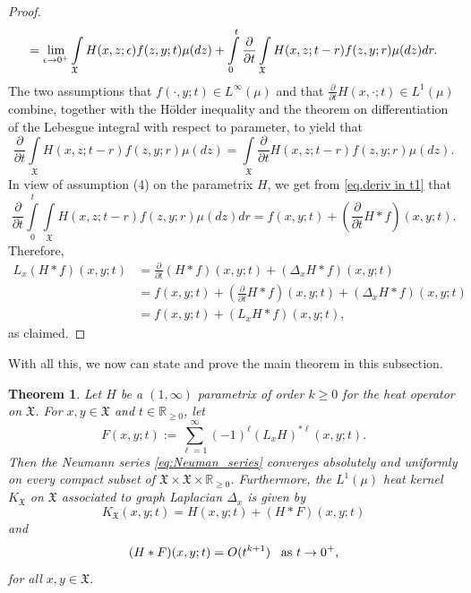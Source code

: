 \documentclass[11pt,reqno]{amsart}
\newtheorem{theorem}{Theorem}
\theoremstyle{remark}
\theoremstyle{definition}
\numberwithin{theorem}{section} \numberwithin{equation}{section}
\newcommand{\X}{\mathfrak{X}}
\begin{document}
\begin{proof}
\begin{align}
=\lim_{\epsilon\to0^+}\int\limits_{\X}H(x,z;\epsilon)f(z,y;t)\mu(dz)+\int\limits _{0}^{t} \frac{\partial}{\partial t} \int\limits_{\X}
H(x,z;t-r)f(z,y;r) \mu(dz)dr.\notag
\end{align}
The two assumptions that $f(\cdot,y;t)\in L^\infty(\mu)$ and that $\frac{\partial}{\partial t}  H(x,\cdot;t)\in L^1(\mu)$ combine,
together with the H\"older inequality and the theorem on differentiation of the Lebesgue integral with respect to parameter, to yield that
$$
\frac{\partial}{\partial t} \int\limits_{\X}
H(x,z;t-r)f(z,y;r) \mu(dz)= \int\limits_{\X}\frac{\partial}{\partial t} H(x,z;t-r)f(z,y;r) \mu(dz).
$$
In view of assumption (4) on the parametrix $H$, we get from \eqref{eq.deriv in t1} that
$$
\frac{\partial}{\partial t}\int\limits _{0}^{t}\int\limits_{\X}H(x,z;t-r)f(z,y;r) \mu(dz)dr= f(x,y;t) +
\left(\frac{\partial}{\partial t}H\ast f\right)(x,y;t).
$$
Therefore,
\begin{align*}
L_{x}(H\ast f)(x,y;t) &=
  \frac{\partial}{\partial t}(H\ast f)(x,y;t)+   (\Delta_{x}H\ast f)(x,y;t)
\\&=f(x,y;t)+\left(\frac{\partial}{\partial t}H\ast f\right)(x,y;t)+(\Delta_{x}H\ast f)(x,y;t)
\\&=f(x,y;t)+(L_{x}H\ast f)(x,y;t),
\end{align*}
as claimed.
\end{proof}

With all this, we now can state and prove the main theorem in this subsection.

\begin{theorem}
\label{thm: formula for heat kernel} Let $H$ be a $(1,\infty)$ parametrix of
order $k\geq0$ for the heat operator on $\X$.  For $x,y\in \X$ and $t\in \mathbb{R}_{\geq 0}$, let
\begin{equation}\label{eq:Neuman_series}
F(x,y;t):=\sum_{\ell=1}^{\infty}(-1)^{\ell}
(L_{x}H)^{\ast\ell}(x,y;t).
\end{equation}
Then the Neumann series \eqref{eq:Neuman_series}
converges absolutely and uniformly on every compact subset of $\X\times \X\times\mathbb{R}_{\geq 0}$.
Furthermore, the $L^1(\mu)$ heat kernel $K_{\X}$ on $\X$
associated to graph Laplacian $\Delta_{x}$ is given by
\begin{equation}\label{eq:heat_kernel_parametrix}
K_{\X}(x,y;t)=H(x,y;t)+(H\ast F)(x,y;t)
\end{equation}
and
\begin{equation}\label{eq. small t asympt}
(H\ast F)(x,y;t)
= O(t^{k+1})
\,\,\,\,\,
\text{\rm as $t \rightarrow 0^+$,}
\end{equation}
for all $x,y\in\X$.
\end{theorem}
\end{document}
